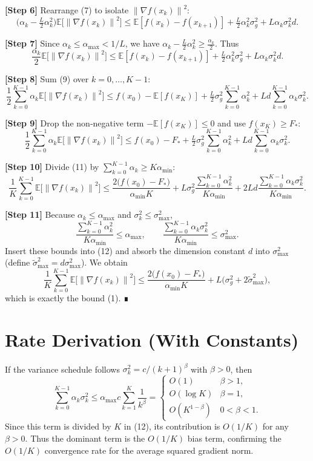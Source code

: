 \documentclass{article}
\newcommand{\E}{\mathbb{E}}
\newcommand{\norm}[1]{\left\|#1\right\|}
\newcommand{\grad}{\nabla}
\begin{document}
\noindent\textbf{[Step 6]} Rearrange (7) to isolate $\norm{\grad f(x_k)}^{2}$:
\[
\big(\alpha_k-\tfrac{L}{2}\alpha_k^{2}\big)\E\!\big[\norm{\grad f(x_k)}^{2}\big]
\le \E[f(x_k)-f(x_{k+1})]
+\tfrac{L}{2}\alpha_k^{2}\sigma_{g}^{2}+L\alpha_k\sigma_k^{2}d .
\tag{8}
\]

\noindent\textbf{[Step 7]} Since $\alpha_k\le\alpha_{\max}<1/L$, we have $\alpha_k-\frac{L}{2}\alpha_k^{2}\ge\frac{\alpha_k}{2}$. Thus
\[
\frac{\alpha_k}{2}\E\!\big[\norm{\grad f(x_k)}^{2}\big]
\le \E[f(x_k)-f(x_{k+1})]
+\tfrac{L}{2}\alpha_k^{2}\sigma_{g}^{2}+L\alpha_k\sigma_k^{2}d .
\tag{9}
\]

\noindent\textbf{[Step 8]} Sum (9) over $k=0,\dots,K-1$:
\[
\frac{1}{2}\sum_{k=0}^{K-1}\alpha_k\E\!\big[\norm{\grad f(x_k)}^{2}\big]
\le f(x_0)-\E[f(x_K)]
+\tfrac{L}{2}\sigma_{g}^{2}\sum_{k=0}^{K-1}\alpha_k^{2}
+L d\sum_{k=0}^{K-1}\alpha_k\sigma_k^{2}.
\tag{10}
\]

\noindent\textbf{[Step 9]} Drop the non‑negative term $-\E[f(x_K)]\le 0$ and use $f(x_K)\ge F_{*}$:
\[
\frac{1}{2}\sum_{k=0}^{K-1}\alpha_k\E\!\big[\norm{\grad f(x_k)}^{2}\big]
\le f(x_0)-F_{*}
+\tfrac{L}{2}\sigma_{g}^{2}\sum_{k=0}^{K-1}\alpha_k^{2}
+L d\sum_{k=0}^{K-1}\alpha_k\sigma_k^{2}.
\tag{11}
\]

\noindent\textbf{[Step 10]} Divide (11) by $\sum_{k=0}^{K-1}\alpha_k\ge K\alpha_{\min}$:
\[
\frac{1}{K}\sum_{k=0}^{K-1}\E\!\big[\norm{\grad f(x_k)}^{2}\big]
\le
\frac{2\big(f(x_0)-F_{*}\big)}{\alpha_{\min}K}
+L\sigma_{g}^{2}\frac{\sum_{k=0}^{K-1}\alpha_k^{2}}{K\alpha_{\min}}
+2L d\frac{\sum_{k=0}^{K-1}\alpha_k\sigma_k^{2}}{K\alpha_{\min}}.
\tag{12}
\]

\noindent\textbf{[Step 11]} Because $\alpha_k\le\alpha_{\max}$ and $\sigma_k^{2}\le\sigma_{\max}^{2}$,
\[
\frac{\sum_{k=0}^{K-1}\alpha_k^{2}}{K\alpha_{\min}}\le\alpha_{\max},
\qquad
\frac{\sum_{k=0}^{K-1}\alpha_k\sigma_k^{2}}{K\alpha_{\min}}\le\sigma_{\max}^{2}.
\]
Insert these bounds into (12) and absorb the dimension constant $d$ into $\sigma_{\max}^{2}$ (define $\tilde\sigma_{\max}^{2}=d\sigma_{\max}^{2}$). We obtain
\[
\frac{1}{K}\sum_{k=0}^{K-1}\E\!\big[\norm{\grad f(x_k)}^{2}\big]
\le
\frac{2\big(f(x_0)-F_{*}\big)}{\alpha_{\min}K}
+L\big(\sigma_{g}^{2}+2\tilde\sigma_{\max}^{2}\big),
\]
which is exactly the bound (1). ∎

\section*{Rate Derivation (With Constants)}
If the variance schedule follows $\sigma_k^{2}=c/(k+1)^{\beta}$ with $\beta>0$, then  
\[
\sum_{k=0}^{K-1}\alpha_k\sigma_k^{2}\le \alpha_{\max}c\sum_{k=1}^{K}\frac{1}{k^{\beta}}
=
\begin{cases}
O(1) & \beta>1,\\[2mm]
O(\log K) & \beta=1,\\[2mm]
O(K^{1-\beta}) & 0<\beta<1.
\end{cases}
\]
Since this term is divided by $K$ in (12), its contribution is $O(1/K)$ for any $\beta>0$.  
Thus the dominant term is the $O(1/K)$ bias term, confirming the $O(1/K)$ convergence rate for the average squared gradient norm.
\end{document}
